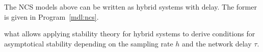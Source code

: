         The NCS models above can be written as hybrid systems with delay.
        The former is given in Program~\ref{mdl:ncs}.


        what allows applying stability theory for hybrid systems to derive conditions for asymptotical stability depending on the sampling rate $h$ and the network delay $\tau$.





